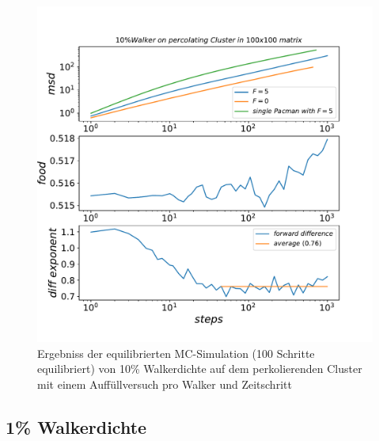 \documentclass[a4paper, 12pt]{report}
\begin{document}
\begin{figure}[H]
	\centering
	\includegraphics[scale=0.75]{new_food10_shifted100.pdf}
	\caption{Ergebniss der equilibrierten MC-Simulation (100 Schritte equilibriert) von 10\% Walkerdichte auf dem perkolierenden Cluster mit einem Auffüllversuch pro Walker und Zeitschritt}
\end{figure}
\clearpage

\subsection{1\% Walkerdichte}
\end{document}
